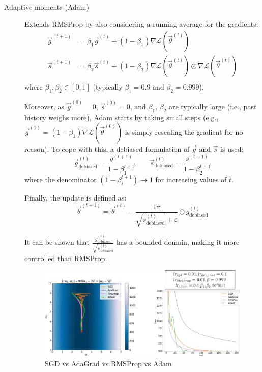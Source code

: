 \begin{description}
    \item[Adaptive moments (Adam)] 
        Extends RMSProp by also considering a running average for the gradients:
        \[
            \begin{split}
                \vec{g}^{(t+1)} &= \beta_1 \vec{g}^{(t)} + (1-\beta_1) \nabla\mathcal{L}(\vec{\theta}^{(t)}) \\
                \vec{s}^{(t+1)} &= \beta_2 \vec{s}^{(t)} + (1-\beta_2) \nabla\mathcal{L}(\vec{\theta}^{(t)}) \odot \nabla\mathcal{L}(\vec{\theta}^{(t)}) \\
            \end{split}
        \]
        where $\beta_1, \beta_2 \in [0, 1]$ (typically $\beta_1 = 0.9$ and $\beta_2 = 0.999$).

        Moreover, as $\vec{g}^{(0)} = 0$, $\vec{s}^{(0)} = 0$, and $\beta_1$, $\beta_2$ are typically large (i.e., past history weighs more), Adam starts by taking small steps (e.g., $\vec{g}^{(1)} = (1-\beta_1) \nabla\mathcal{L}(\vec{\theta}^{(0)})$ is simply rescaling the gradient for no reason). To cope with this, a debiased formulation of $\vec{g}$ and $\vec{s}$ is used:
        \[
            \vec{g}^{(t)}_{\text{debiased}} = \frac{g^{(t+1)}}{1-\beta_1^{t+1}} 
            \qquad
            \vec{s}^{(t)}_{\text{debiased}} = \frac{s^{(t+1)}}{1-\beta_2^{t+1}} 
        \]
        where the denominator $(1-\beta_i^{t+1}) \rightarrow 1$ for increasing values of $t$.

        Finally, the update is defined as:
        \[
            \vec{\theta}^{(t+1)} = \vec{\theta}^{(t)} - \frac{\texttt{lr}}{\sqrt{s^{(t)}_{\text{debiased}}} + \varepsilon} \odot g^{(t)}_{\text{debiased}}
        \]

        \begin{remark}
            It can be shown that $\frac{g^{(t)}_{\text{debiased}}}{\sqrt{s^{(t)}_{\text{debiased}}}}$ has a bounded domain, making it more controlled than RMSProp.
        \end{remark}

        \begin{figure}[H]
            \centering
            \includegraphics[width=0.75\linewidth]{./img/adam.jpg}
            \caption{SGD vs AdaGrad vs RMSProp vs Adam}
        \end{figure}


\end{description}
